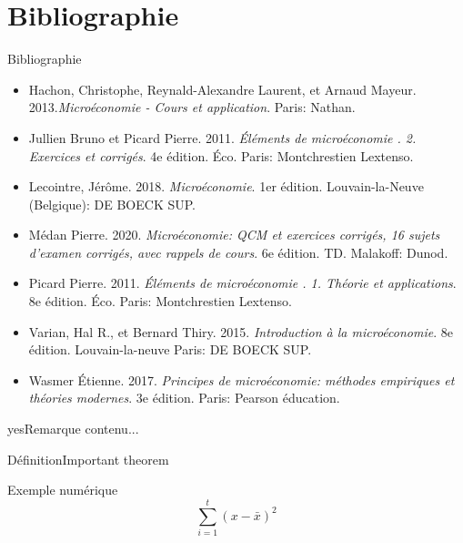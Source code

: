 \documentclass{beamer}
\begin{document}
\section{Bibliographie}
\begin{frame}{Bibliographie}
	
	\begin{itemize}
		
		\item Hachon, Christophe, Reynald-Alexandre Laurent, et Arnaud Mayeur. 2013.\textit{Microéconomie - Cours et application}. Paris: Nathan.
		
		\item Jullien Bruno et Picard Pierre. 2011. \textit{Éléments de microéconomie . 2. Exercices et corrigés}. 4e édition. Éco. Paris: Montchrestien Lextenso.
		
		\item Lecointre, Jérôme. 2018.\textit{ Microéconomie}. 1er édition. Louvain-la-Neuve (Belgique): DE BOECK SUP.
		
		\item Médan Pierre. 2020.\textit{ Microéconomie: QCM et exercices corrigés, 16 sujets d’examen corrigés, avec rappels de cours}. 6e édition. TD. Malakoff: Dunod.
	
		\item Picard Pierre. 2011. \textit{Éléments de microéconomie . 1. Théorie et applications}. 8e édition. Éco. Paris: Montchrestien Lextenso.
		
		\item Varian, Hal R., et Bernard Thiry. 2015. \textit{Introduction à la microéconomie}. 8e édition. Louvain-la-neuve Paris: DE BOECK SUP.
		
		\item Wasmer Étienne. 2017. \textit{Principes de microéconomie: méthodes empiriques et théories modernes}. 3e édition. Paris: Pearson éducation.
		
	\end{itemize}


\end{frame}	
	
	
	\begin{frame}
		\begin{block}{yes}{Remarque}
			contenu...
		\end{block}
		
		\begin{alertblock}{Définition}{Important theorem} 
			
		\end{alertblock}
		
		\begin{exampleblock}{Exemple numérique}
			\[ 
			\sum_{i=1}^{t}(x-\bar{x})^2
			\]
		\end{exampleblock}
	\end{frame}
	
	
	
\end{document}
